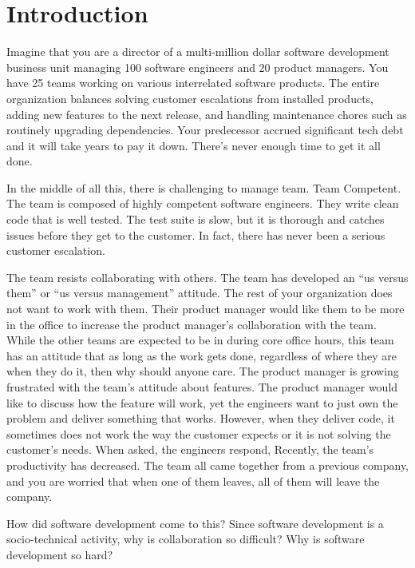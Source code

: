 

\chapter{Introduction}
\label{IntroductionChapter}


Imagine that you are a director of a multi-million dollar software development business unit managing 100 software engineers and 20 product managers. You have 25 teams working on various interrelated software products. The entire organization balances solving customer escalations from installed products, adding new features to the next release, and handling maintenance chores such as routinely upgrading dependencies. Your predecessor accrued significant tech debt and it will take years to pay it down. There's never enough time to get it all done. 


In the middle of all this, there is challenging to manage team. Team Competent. The team is composed of highly competent software engineers. They write clean code that is well tested. The test suite is slow, but it is thorough and catches issues before they get to the customer. In fact, there has never been a serious customer escalation.


The team resists collaborating with others. The team has developed an “us versus them” or “us versus management” attitude. The rest of your organization does not want to work with them. 
Their product manager would like them to be more in the office to increase the product manager's collaboration with the team. While the other teams are expected to be in during core office hours, this team has an attitude that as long as the work gets done, regardless of where they are when they do it, then why should anyone care. The product manager is growing frustrated with the team's attitude about features. The product manager would like to discuss how the feature will work, yet the engineers want to just own the problem and deliver something that works. However, when they deliver code, it sometimes does not work the way the customer expects or it is not solving the customer's needs. When asked,  the engineers respond,  Recently, the team's productivity has decreased. The team all came together from a previous company, and you are worried that when one of them leaves, all of them will leave the company.


How did software development come to this? Since software development is a socio-technical activity, why is collaboration so difficult? Why is software development so hard?  


